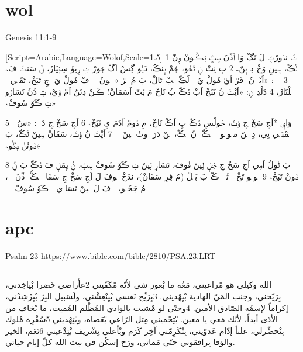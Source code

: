 \documentclass[12pt,fleqn,titlepage,twoside,a4paper]{book}
\begin{document}
\section{wol}

Genesis 11:1-9

\begin{arab}[utf]

[Script=Arabic,Language=Wolof,Scale=1.5]
1 ݖَ ندࣷورْتࣹ لَ نَگْ وَا اࣵدِّنَ سࣺݒَّ بࣷڪّࣷونْ وࣹنّ لࣵڪّ، سࣹينِ وَخْ دِ بࣹنّ؞
2 بِ نِتْ ݧِ تࣷخࣷو، جࣴمْ ݒࣹنڪُ، دَݧࣷو گِسْ اَگْ جࣷورْ ݖِ رࣺيوُ سِنࣹيَارْ، ݧُ سَنݖّ فَ؞
3 ݧُ نࣹ: «اَيْݖَ نُ دࣹفَرْ اَيْ مٗولْ يُ ݧُ لَڪّ ݖِبْ تَالْ، بَ مُ ݧࣷرْ؞» نࣷونُ ݧُ دࣹفْ مٗولْ يَ دࣷجِ تَبَخْ، تَقَلࣹي ڪࣷ ڪࣷلْتَارْ،
4 دَلْدِ نࣹ: «اَيْݖَ نُ تَبَخْ اَبْ دࣴڪّ بُ تَاخْ مَ بࣴتّ اَسَمَانْ؛ ڪࣷنْ دِنَنُ اَمْ وࣷيْ، تࣹ دُنُ تَسَارࣷو ݖِ ڪَوْ سُوفْ؞»

5 وَايࣹ *اَجِ سَخْ جِ وࣵݖّ، خࣷولْسِ دࣴڪّ بِ اَڪْ تَاخْ، مِ دࣷومْ آدَمَ يِ تَبَخْ؞
 6 اَجِ سَخْ جِ دَ نࣹ: «سُ ݧُ تࣵمْبَلࣹي نِي، دِ مࣹنّ مبࣷولࣷو تࣹ بࣷڪّ وࣹنّ لࣵڪّ، ڪࣷنْ دَرَ دࣷوتُ لࣹينْ تࣴ؞
7 اَيْݖَ نُ وࣵݖّ، سَفَانْ سࣹينْ لࣵڪّ، بَ دࣷوتُݧُ دࣺگّࣷو؞»

8 بَ لࣷولُ اَمࣹي اَجِ سَخْ جِ جࣴلࣹ لࣹينْ فࣷوفَ، تَسَارࣹ لࣹينْ ݖِ ڪَوْ سُوفْ سࣺݒّ، ݧُ يࣹمَلࣹ فَ دࣴڪّ بَ ݧُ دࣷونْ تَبَخْ؞
9 لࣷولࣷو تَخْ ݧُ تُدّࣹ دࣴڪّ بَ بَبࣹلْ (مُ فِرِ سَفَانْ)، ندَخْ فࣷوفَ لَ اَجِ سَخْ جِ سَفَانࣹ لࣵڪُّ اࣵدِّنَ سࣺݒّ، مُ جَخَسࣷو، تࣹ فَ لَ لࣹينْ تَسَارࣹي ݖِ ڪَوْ سُوفْ سࣺݒّ؞

\end{arab}

\section{apc}

Psalm 23 https://www.bible.com/bible/2810/PSA.23.LRT

\begin{arab}[utf]
\section*{}

الله وكيلي هو مْراعيني،
مَعُه ما بْعوز شي لأنّه مْكَفّيني
2عأَراضي خَضرا بْياخِدني، بِرَيّحني،
وجنب المَيّ الهادية بْيِهْديني.
3بِرَيِّح نَفسي بْيِنْعِشْني،
ولَسَبيل البِرّ بْيِرْشِدْني،
إكراماً لإسمُه الصّادق الأمين.
4وحتّى لو مْشيت بالوادي المُظْلم المُميت،
ما بْخاف من الأذى أبداً، لأنّك مَعي يا معين.
بْتِحْميني مِتل الرّاعي بْعَصاه، وبْتِهْديني
5سُفْرِة مْلوك بِتْحضِّرلي، علناً إدّام عَدوّيني،
بِتْكَرِمّني آخِر كَرَم وبْأعلى تِشْريف بْتِدْعيني
6نَعَم، الخير والوَفا بِرافقوني حتّى مَماتي،
ورَح إسكُن في بيت الله كلّ إيام حياتي.

\end{arab}
\end{document}
